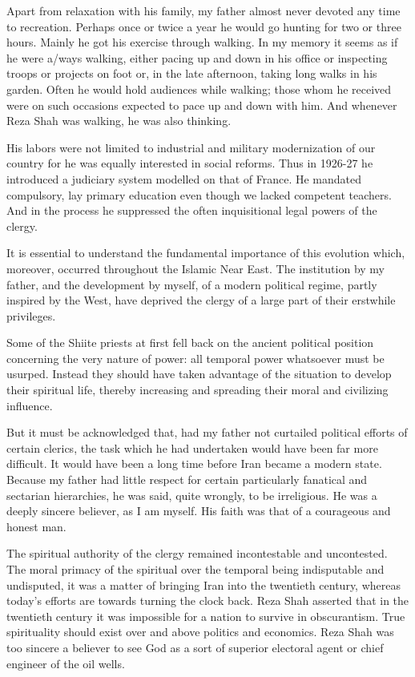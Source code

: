 Apart from relaxation with his family, my father almost never devoted any time to recreation. Perhaps once or twice a year he would go hunting for two or three hours. Mainly he got his exercise through walking. In my memory it seems as if he were a/ways walking, either pacing up and down in his office or inspecting troops or projects on foot or, in the late afternoon, taking long walks in his garden. Often he would hold audiences while walking; those whom he received were on such occasions expected to pace up and down with him. And whenever Reza Shah was walking, he was also thinking. 

His labors were not limited to industrial and military modernization of our country for he was equally interested in social reforms. Thus in 1926-27 he introduced a judiciary system modelled on that of France. He mandated compulsory, lay primary education even though we lacked competent teachers. And in the process he suppressed the often inquisitional legal powers of the clergy. 

It is essential to understand the fundamental importance of this evolution which, moreover, occurred throughout the Islamic Near East. The institution by my father, and the development by myself, of a modern political regime, partly inspired by the West, have deprived the clergy of a large part of their erstwhile privileges. 

Some of the Shiite priests at first fell back on the ancient political position concerning the very nature of power: all temporal power whatsoever must be usurped. Instead they should have taken advantage of the situation to develop their spiritual life, thereby increasing and spreading their moral and civilizing influence. 

But it must be acknowledged that, had my father not curtailed political efforts of certain clerics, the task which he had undertaken would have been far more difficult. It would have been a long time before Iran became a modern state. Because my father had little respect for certain particularly fanatical and sectarian hierarchies, he was said, quite wrongly, to be irreligious. He was a deeply sincere believer, as I am myself. His faith was that of a courageous and honest man. 

The spiritual authority of the clergy remained incontestable and uncontested. The moral primacy of the spiritual over the temporal being indisputable and undisputed, it was a matter of bringing Iran into the twentieth century, whereas today’s efforts are towards turning the clock back. Reza Shah asserted that in the twentieth century it was impossible for a nation to survive in obscurantism. True spirituality should exist over and above politics and economics. Reza Shah was too sincere a believer to see God as a sort of superior electoral agent or chief engineer of the oil wells. 

